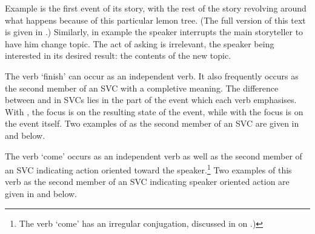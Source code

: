 Example  is the first event of its story,
with the rest of the story revolving around what
happens because of this particular lemon tree.
(The full version of this text is given in .)
Similarly, in example  the speaker
interrupts the main storyteller to have him change topic.
The act of asking is irrelevant, the speaker being interested
in its desired result: the contents of the new topic.

The verb  `finish' can occur as an independent verb.
It also frequently occurs as the second member of an SVC with a completive meaning.
The difference between  and  in SVCs
lies in the part of the event which each verb emphasises.
With , the focus is on the resulting state of the event,
while with  the focus is on the event itself.
Two examples of  as the second member of an SVC
are given in  and  below.

\begin{exe}
	\label{ex:130825-6, 0.36}
	\label{ex:130825-7, 2.29}
\end{exe}

The verb  `come' occurs as an independent verb
as well as the second member of an SVC
indicating action oriented toward the speaker.\footnote{
		The verb  `come' has an irregular conjugation,
		discussed in  on .)}
Two examples of this verb as the second member of an SVC
indicating speaker oriented action are given in
 and  below.


